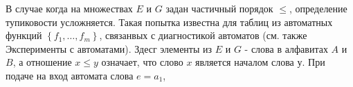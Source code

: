 \documentclass[10pt]{article}
\begin{document}
В случае когда на множествах $E$ и $G$ задан частичный порядок $\leqslant$, определение тупиковости усложняется. Такая попытка известна для таблиц из автоматных функций $\left\{f_{1}, \ldots, f_{m}\right\}$, связанвых с диагностикой автоматов (см. также Эксперименты с автоматами). Здесг элементы из $E$ и $G$ - слова в алфавитах $A$ и $B$, а отношение $x \leqslant y$ означает, что слово $x$ является началом слова $у$. При подаче на вход автомата слова $e=a_{1}$,
\end{document}
